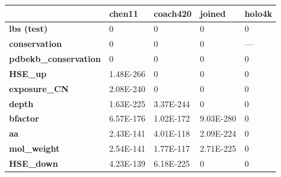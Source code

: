 \begin{table}[]
\centering
\begin{tabular}{lllll}
\hline
\textbf{}                     & \textbf{chen11}                & \textbf{coach420}               & \textbf{joined}                & \textbf{holo4k}                 \\ \hline
\textbf{lbs (test)}                  & 0                              & 0                               & 0                              & 0                               \\
\textbf{conservation}         & 0                              & 0                               & 0                              & ---                             \\
\textbf{pdbekb\_conservation} & 0                              & 0                               & 0                              & 0                               \\
\textbf{HSE\_up}              & 1.48E-266                      & 0                               & 0                              & 0                               \\
\textbf{exposure\_CN}         & 2.08E-240                      & 0                               & 0                              & 0                               \\
\textbf{depth}                & 1.63E-225                      & 3.37E-244                       & 0                              & 0                               \\
\textbf{bfactor}              & 6.57E-176                      & 1.02E-172                       & 9.03E-280                      & 0                               \\
\textbf{aa}                   & 2.43E-141                      & 4.01E-118                       & 2.09E-224                      & 0                               \\
\textbf{mol\_weight}          & 2.54E-141                      & 1.77E-117                       & 2.71E-225                      & 0                               \\
\textbf{HSE\_down}            & 4.23E-139                      & 6.18E-225                       & 0                              & 0                               \\

\end{tabular}
\end{table}
